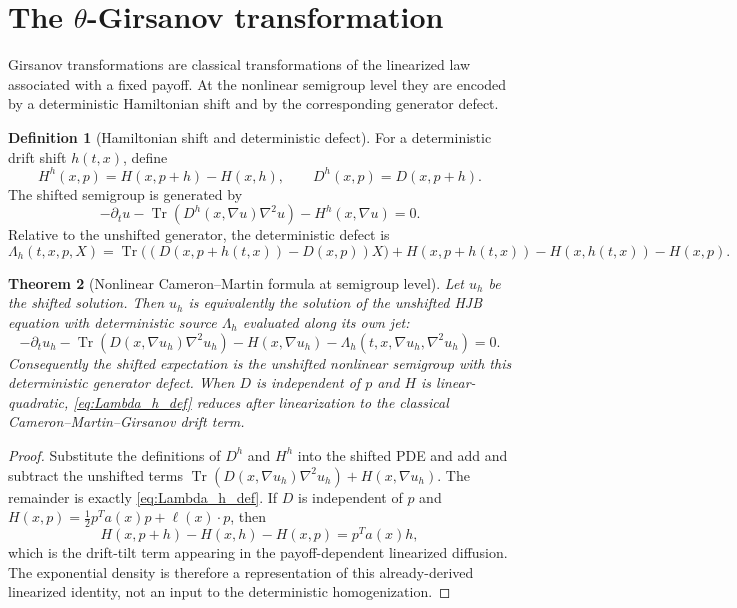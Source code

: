 \documentclass[12pt, letterpaper]{amsart}
\providecommand{\Tr}{\operatorname{Tr}}
\theoremstyle{plain}
\newtheorem{theorem}{Theorem}[section]
\theoremstyle{definition}
\newtheorem{definition}[theorem]{Definition}
\theoremstyle{remark}
\begin{document}
\section{The \texorpdfstring{$\theta$}{theta}-Girsanov transformation}
\label{sec:girsanov_corrected}

Girsanov transformations are classical transformations of the linearized law associated with a fixed payoff.  At the nonlinear semigroup level they are encoded by a deterministic Hamiltonian shift and by the corresponding generator defect.

\begin{definition}[Hamiltonian shift and deterministic defect]
For a deterministic drift shift $h(t,x)$, define
\begin{equation}
    H^h(x,p)=H(x,p+h)-H(x,h),
    \qquad
    D^h(x,p)=D(x,p+h).
\end{equation}
The shifted semigroup is generated by
\begin{equation}
    -\partial_tu-\Tr(D^h(x,\nabla u)\nabla^2u)-H^h(x,\nabla u)=0.
\end{equation}
Relative to the unshifted generator, the deterministic defect is
\begin{equation}
\label{eq:Lambda_h_def}
    \Lambda_h(t,x,p,X)
    =\Tr\big((D(x,p+h(t,x))-D(x,p))X\big)
     +H(x,p+h(t,x))-H(x,h(t,x))-H(x,p).
\end{equation}
\end{definition}

\begin{theorem}[Nonlinear Cameron--Martin formula at semigroup level]
\label{thm:nonlinear_cm}
Let $u_h$ be the shifted solution.  Then $u_h$ is equivalently the solution of the unshifted HJB equation with deterministic source $\Lambda_h$ evaluated along its own jet:
\begin{equation}
    -\partial_tu_h-\Tr(D(x,\nabla u_h)\nabla^2u_h)-H(x,\nabla u_h)
    -\Lambda_h(t,x,\nabla u_h,\nabla^2u_h)=0.
\end{equation}
Consequently the shifted expectation is the unshifted nonlinear semigroup with this deterministic generator defect.  When $D$ is independent of $p$ and $H$ is linear-quadratic, \eqref{eq:Lambda_h_def} reduces after linearization to the classical Cameron--Martin--Girsanov drift term.
\end{theorem}

\begin{proof}
Substitute the definitions of $D^h$ and $H^h$ into the shifted PDE and add and subtract the unshifted terms $\Tr(D(x,\nabla u_h)\nabla^2u_h)+H(x,\nabla u_h)$.  The remainder is exactly \eqref{eq:Lambda_h_def}.  If $D$ is independent of $p$ and $H(x,p)=\frac12p^Ta(x)p+\ell(x)\cdot p$, then
\begin{equation}
    H(x,p+h)-H(x,h)-H(x,p)=p^Ta(x)h,
\end{equation}
which is the drift-tilt term appearing in the payoff-dependent linearized diffusion.  The exponential density is therefore a representation of this already-derived linearized identity, not an input to the deterministic homogenization.
\end{proof}
\end{document}
